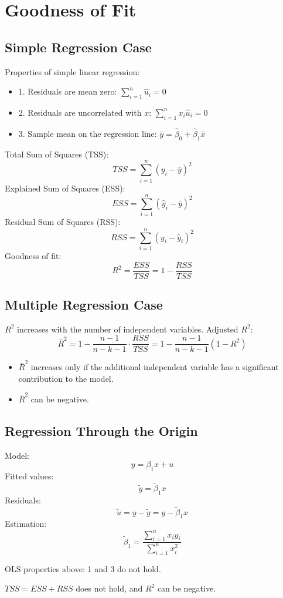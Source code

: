 \documentclass[11pt,a4paper]{article}
\begin{document}
\section{Goodness of Fit}
\subsection{Simple Regression Case}
Properties of simple linear regression:
\begin{itemize}
    \item 1. Residuals are mean zero: $\sum_{i=1}^n \hat{u}_i = 0$
    \item 2. Residuals are uncorrelated with $x$: $\sum_{i=1}^n x_i \hat{u}_i = 0$
    \item 3. Sample mean on the regression line: $\bar{y} = \hat{\beta}_0 + \hat{\beta}_1 \bar{x}$
\end{itemize}

Total Sum of Squares (TSS):
\[
TSS = \sum_{i=1}^n (y_i - \bar{y})^2
\]
Explained Sum of Squares (ESS):
\[
ESS = \sum_{i=1}^n (\hat{y}_i - \bar{y})^2
\]
Residual Sum of Squares (RSS):
\[
RSS = \sum_{i=1}^n (y_i - \hat{y}_i)^2
\]
Goodness of fit:
\[
R^2 = \frac{ESS}{TSS} = 1 - \frac{RSS}{TSS}
\]

\subsection{Multiple Regression Case}
$R^2$ increases with the number of independent variables.
Adjusted $R^2$:
\[
\bar{R}^2 = 1 - \frac{n-1}{n-k-1} \cdot \frac{RSS}{TSS} = 1 - \frac{n-1}{n-k-1} (1 - R^2)
\]

\begin{itemize}
    \item $\bar{R}^2$ increases only if the additional independent variable has a significant contribution to the model.
    \item $\bar{R}^2$ can be negative.
\end{itemize}

\subsection{Regression Through the Origin}
Model:
\[
y = \beta_1 x + u
\]
Fitted values:
\[
\tilde{y} = \tilde{\beta}_1 x
\]
Residuals:
\[
\tilde{u} = y - \tilde{y} = y - \tilde{\beta}_1 x
\]
Estimation:
\[
\tilde{\beta}_1 = \frac{\sum_{i=1}^n x_i y_i}{\sum_{i=1}^n x_i^2}
\]

OLS properties above: 1 and 3 do not hold. \par
$TSS = ESS + RSS$ does not hold, and $R^2$ can be negative.
\end{document}

